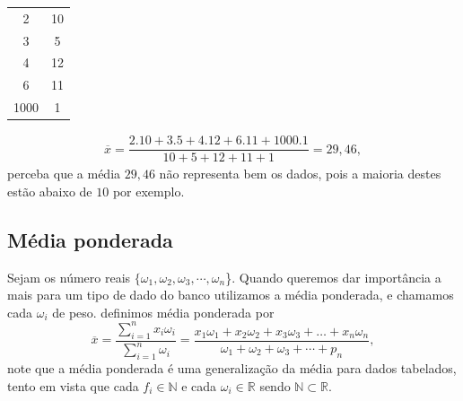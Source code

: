 \begin{enumerate}
\begin{table}[H]
\begin{tabular}{cc}
        \hline
        2 & 10 \\
        3 & 5 \\
        4 & 12 \\
        6 & 11 \\
        1000 & 1\\
        \hline
    \end{tabular}
\end{table}
\begin{align*}
    \overline{x} = \dfrac{2.10 + 3.5 + 4.12+6.11+ 1000.1}{10+5+12+11+1} = 29,46,
\end{align*}
perceba que a média $29,46$ não representa bem os dados, pois a maioria destes estão abaixo de $10$ por exemplo.
\end{enumerate}
\subsection{Média ponderada}
Sejam os número reais $\{\omega_1, \omega_2,\omega_3,\cdots, \omega_n$\}. Quando queremos dar importância a mais para um tipo de dado do banco utilizamos a média ponderada, e chamamos cada $\omega_i$ de peso. definimos média ponderada por
\begin{equation}
    \label{peso}
    \overline{x} = \dfrac{\displaystyle\sum_{i=1}^{n}x_i\omega_i}{\displaystyle\sum_{i=1}^n\omega_i} = \dfrac{x_1\omega_1 + x_2\omega_2 + x_3\omega_3 + \dots + x_n\omega_n}{\omega_1 + \omega_2 + \omega_3 + \cdots + p_n},
\end{equation}
note que a média ponderada é uma generalização da média para dados tabelados, tento em vista que cada $f_i \in \mathbb{N}$ e cada $\omega_i \in \mathbb{R}$ sendo $\mathbb{N}\subset \mathbb{R}$.

